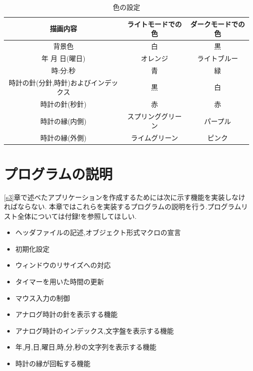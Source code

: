\documentclass[a4j]{jarticle}
\begin{document}
         \begin{table}[H]
          \caption{色の設定}
        \label{color}
        \begin{center}
            \begin{tabular}{c|c|c}\hline
              描画内容 & ライトモードでの色 & ダークモードでの色 \\ \hline
              背景色 & 白 & 黒 \\
              年 月 日(曜日) &  オレンジ & ライトブルー \\
              時:分:秒 & 青 & 緑 \\
              時計の針(分針,時針)およびインデックス & 黒 & 白 \\
              時計の針(秒針) & 赤 & 赤 \\
              時計の縁(内側) & スプリンググリーン & パープル \\
              時計の縁(外側) & ライムグリーン & ピンク \\ \hline
            \end{tabular}
        \end{center}
        \end{table}

    \section{プログラムの説明}
    \ref{s3}章で述べたアプリケーションを作成するためには次に示す機能を実装しなければならない.
    本章ではこれらを実装するプログラムの説明を行う.プログラムリスト全体については付録!を参照してほしい.
    \begin{itemize}
      \item ヘッダファイルの記述,オブジェクト形式マクロの宣言
      \item 初期化設定
      \item ウィンドウのリサイズへの対応
      \item タイマーを用いた時間の更新
      \item マウス入力の制御
      \item アナログ時計の針を表示する機能
      \item アナログ時計のインデックス,文字盤を表示する機能
      \item 年,月,日,曜日,時,分,秒の文字列を表示する機能
      \item 時計の縁が回転する機能 
    \end{itemize}
\end{document}
